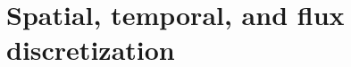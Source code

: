 \section{Spatial, temporal, and flux discretization}
\label{sec:numerical-framework:discretization}
